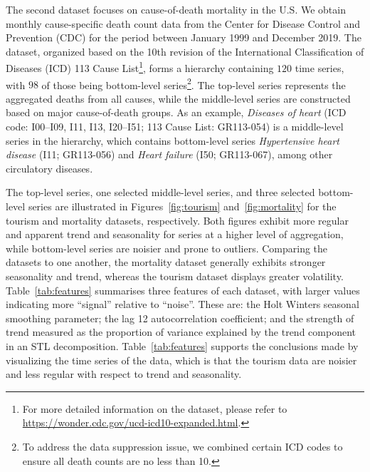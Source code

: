 \documentclass[a4paper,review,12pt,authoryear]{elsarticle}
\begin{document}
The second dataset focuses on cause-of-death mortality in the U.S. We obtain monthly cause-specific death count data from the Center for Disease Control and Prevention (CDC) for the period between January 1999 and December 2019. The dataset, organized based on the 10th revision of the International Classification of Diseases (ICD) 113 Cause List\footnote{For more detailed information on the dataset, please refer to \url{https://wonder.cdc.gov/ucd-icd10-expanded.html}.}, forms a hierarchy containing $120$ time series, with $98$ of those being bottom-level series\footnote{To address the data suppression issue, we combined certain ICD codes to ensure all death counts are no less than 10. }. The top-level series represents the aggregated deaths from all causes, while the middle-level series are constructed based on major cause-of-death groups. As an example, \textit{Diseases of heart} (ICD code: I00--I09, I11, I13, I20--I51; 113 Cause List: GR113-054) is a middle-level series in the hierarchy, which contains bottom-level series \textit{Hypertensive heart disease} (I11; GR113-056) and \textit{Heart failure} (I50; GR113-067), among other circulatory diseases.  %


The top-level series, one selected middle-level series, and three selected bottom-level series are illustrated in Figures~\ref{fig:tourism} and~\ref{fig:mortality} for the tourism and mortality datasets, respectively. 
Both figures exhibit more regular and apparent trend and seasonality for series at a higher level of aggregation, while bottom-level series are noisier and prone to outliers. 
Comparing the datasets to one another, the mortality dataset generally exhibits stronger seasonality and trend, whereas the tourism dataset displays greater volatility. Table~\ref{tab:features} summarises three features of each dataset, with larger values indicating more ``signal'' relative to ``noise''. These are: the Holt Winters seasonal smoothing parameter; the lag 12 autocorrelation coefficient; and the strength of trend measured as the proportion of variance explained by the trend component in an STL decomposition. Table~\ref{tab:features} supports the conclusions made by visualizing the time series of the data, which is that the tourism data are noisier and less regular with respect to trend and seasonality.\\
\end{document}
